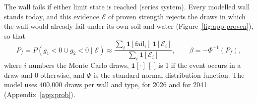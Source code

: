 The wall fails if either limit state is reached (series system). Every
modelled wall stands today, and this evidence $\mathcal{E}$ of proven strength
\parencite{hemel2024} rejects the draws in which the wall would already fail
under its own soil and water (Figure~\ref{fig:app-proven}), so that
\begin{equation}
P_f = P\left(g_1 < 0 \cup g_2 < 0 \mid \mathcal{E}\right) \approx
\frac{\sum_i \mathbf{1}[\mathrm{fail}_i]\,\mathbf{1}[\mathcal{E}_i]}{\sum_i \mathbf{1}[\mathcal{E}_i]},
\qquad \beta = -\Phi^{-1}(P_f), \label{eq:pf}
\end{equation}
where $i$ numbers the Monte Carlo draws, $\mathbf{1}[\cdot]$ [--] is 1 if the
event occurs in a draw and 0 otherwise, and $\Phi$ is the standard normal
distribution function. The model uses 400{,}000 draws per wall and type, for 2026
and for 2041 (Appendix~\ref{app:prob}).

